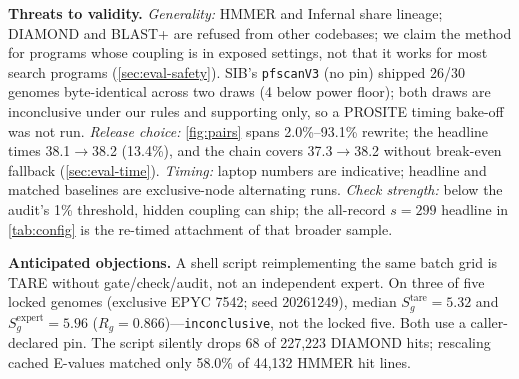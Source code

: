 \documentclass[letterpaper,twocolumn,10pt]{article}
\theoremstyle{definition}
\newcommand{\sys}{TARE\xspace}
\newcommand{\sys}{PARE\xspace}
\begin{document}
\textbf{Threats to validity.}
\textit{Generality:} HMMER and Infernal share lineage; DIAMOND and BLAST+ are refused from other codebases; we claim the method for programs whose coupling is in exposed settings, not that it works for most search programs (\cref{sec:eval-safety}).
SIB's \texttt{pfscanV3} (no pin) shipped 26/30 genomes byte\nobreakdash-identical across two draws (4 below power floor); both draws are inconclusive under our rules and supporting only, so a PROSITE timing bake\nobreakdash-off was not run.
\textit{Release choice:} \cref{fig:pairs} spans 2.0\%--93.1\% rewrite; the headline times 38.1$\rightarrow$38.2 (13.4\%), and the chain covers 37.3$\rightarrow$38.2 without break\nobreakdash-even fallback (\cref{sec:eval-time}).
\textit{Timing:} laptop numbers are indicative; headline and matched baselines are exclusive-node alternating runs.
\textit{Check strength:} below the audit's 1\% threshold, hidden coupling can ship; the all\nobreakdash-record $s{=}299$
headline in \cref{tab:config} is the re\nobreakdash-timed attachment of that broader sample.

\textbf{Anticipated objections.} A shell script reimplementing the same batch grid is \sys without gate/check/audit, not an
independent expert. On three of five locked genomes (exclusive EPYC 7542; seed 20261249), median
$S_g^{\mathrm{tare}}{=}5.32$ and $S_g^{\mathrm{expert}}{=}5.96$ ($R_g{=}0.866$)---\texttt{inconclusive}, not the locked five.
Both use a caller\nobreakdash-declared pin. The script silently drops 68 of 227{,}223 DIAMOND hits; rescaling cached E-values
matched only 58.0\% of 44{,}132 HMMER hit lines.
\end{document}

